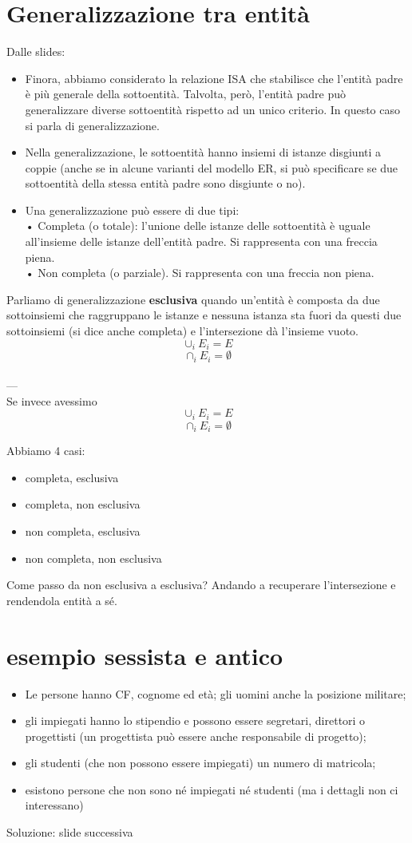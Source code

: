 \section{Generalizzazione tra entità}
Dalle slides:
\begin{itemize}
    \item Finora, abbiamo considerato la relazione ISA che stabilisce che l'entità padre è più generale della sottoentità. Talvolta, però, l'entità padre può generalizzare diverse sottoentità rispetto ad un unico criterio. In questo caso si parla di generalizzazione.
    \item Nella generalizzazione, le sottoentità hanno insiemi di istanze disgiunti a coppie (anche se in alcune varianti del modello ER, si può specificare se due sottoentità della stessa entità padre sono disgiunte o no).
    \item Una generalizzazione può essere di due tipi:
    \\• Completa (o totale): l'unione delle istanze delle sottoentità è uguale all'insieme delle istanze dell'entità padre. Si rappresenta con una freccia piena.
    \\• Non completa (o parziale). Si rappresenta con una freccia non piena.
\end{itemize}
Parliamo di generalizzazione \textbf{esclusiva} quando un'entità è composta da due sottoinsiemi che raggruppano le istanze e nessuna istanza sta fuori da questi due sottoinsiemi (si dice anche completa) e l'intersezione dà l'insieme vuoto. $$\cup_i E_i = E$$ $$\cap_i E_i = \emptyset$$
\\ ---
\\Se invece avessimo $$\cup_i E_i = E$$ $$\cap_i E_i = \emptyset$$

Abbiamo 4 casi:
\begin{itemize}
    \item completa, esclusiva
    \item completa, non esclusiva
    \item non completa, esclusiva
    \item non completa, non esclusiva
\end{itemize}

Come passo da non esclusiva a esclusiva? Andando a recuperare l'intersezione e rendendola entità a sé.

\section{esempio sessista e antico}
\begin{itemize}
    \item Le persone hanno CF, cognome ed età; gli uomini anche la posizione militare; 
    \item gli impiegati hanno lo stipendio e possono essere segretari, direttori o progettisti (un progettista può essere anche responsabile di progetto); 
    \item gli studenti (che non possono essere impiegati) un numero di matricola;
    \item esistono persone che non sono né impiegati né studenti (ma i dettagli non ci interessano)
\end{itemize}
Soluzione: slide successiva

